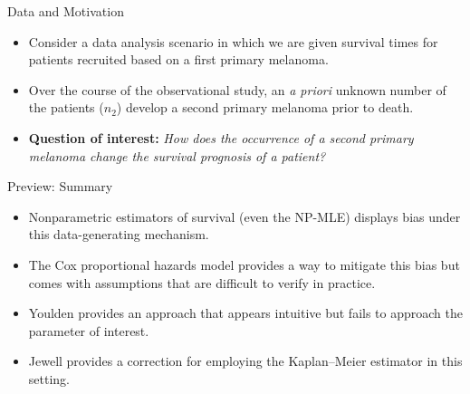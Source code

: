 \documentclass[12pt,t,handout]{beamer}
\begin{document}
\begin{frame}[c]{Data and Motivation}

\begin{center}
\begin{itemize}
  \itemsep12pt
  \item Consider a data analysis scenario in which we are given survival times
    for patients recruited based on a first primary melanoma.
  \item Over the course of the observational study, an \textit{a priori} unknown
    number of the patients ($n_2$) develop a second primary melanoma prior to
    death.
  \item \textbf{Question of interest:} \textit{How does the occurrence of a
    second primary melanoma change the survival prognosis of a patient?}
\end{itemize}
\end{center}

\note{
}

\end{frame}


\begin{frame}[c]{Preview: Summary}

\begin{center}
\begin{itemize}
  \itemsep12pt
  \item Nonparametric estimators of survival (even the NP-MLE) displays bias
    under this data-generating mechanism.
  \item The Cox proportional hazards model provides a way to mitigate this bias
    but comes with assumptions that are difficult to verify in practice.
  \item Youlden provides an approach that appears intuitive but fails to
    approach the parameter of interest.
  \item Jewell provides a correction for employing the Kaplan--Meier estimator
    in this setting.
\end{itemize}
\end{center}


\end{frame}

\end{document}
